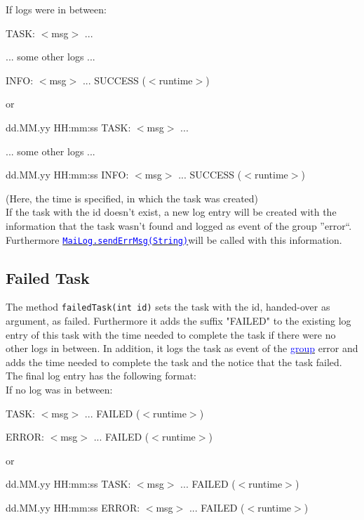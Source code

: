 \documentclass{article}
\newcommand{\refh}[2]{\hyperref[#1] {\textcolor{blue}{#2}}}
\newcommand{\sendErr}{\refh{setup_interface}{\lstinline|MaiLog.sendErrMsg(String)|}}
\begin{document}
	If logs were in between:
	\begin{description}
		\item TASK: $<$msg$>$ ... 
		\item ... some other logs ...
		\item INFO: $<$msg$>$ ... SUCCESS ($<$runtime$>$)
		\item or
		\item dd.MM.yy HH:mm:ss TASK: $<$msg$>$ ...
		\item ... some other logs ...
		\item dd.MM.yy HH:mm:ss INFO: $<$msg$>$ ... SUCCESS ($<$runtime$>$)
	\end{description}
    (Here, the time is specified, in which the task was created) \\
    If the task with the id doesn't exist, a new log entry will be created with the information that the task wasn't found and logged as event of the group ''error``.
    Furthermore \sendErr will be called with this information.

    \subsection{Failed Task}
    \label{tasks_failedTask}
    The method \lstinline|failedTask(int id)| sets the task with the id, handed-over as argument, as failed.
    Furthermore it adds the suffix "FAILED" to the existing log entry of this task with the time needed to complete the task if there were no other logs in between.    
    In addition, it logs the task as event of the \refh{logging_groups}{group} error and adds the time needed to complete the task and the notice that the task failed.
    The final log entry has the following format: \\
    If no log was in between:
    \begin{description}
        \item TASK: $<$msg$>$ ... FAILED ($<$runtime$>$)
        \item ERROR: $<$msg$>$ ... FAILED ($<$runtime$>$)
        \item or
        \item dd.MM.yy HH:mm:ss TASK: $<$msg$>$ ... FAILED ($<$runtime$>$)
        \item dd.MM.yy HH:mm:ss ERROR: $<$msg$>$ ... FAILED ($<$runtime$>$)
    \end{description} ~\\
\end{document}
